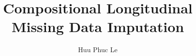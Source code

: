 \newcommand{\PresenterName}{Huu Phuc Le}
\newcommand{\PresentationDate}{}
\title[Missing Data Imputation]{Compositional Longitudinal\\Missing Data Imputation}
\author[\PresenterName]{\PresenterName}
\date[\PresentationDate]{\PresentationDate}
\institute{}

